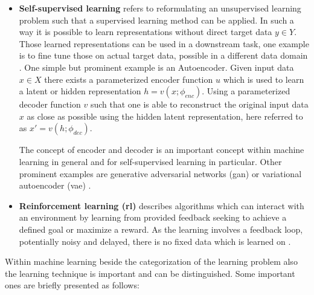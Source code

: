 \documentclass[../main.tex]{subfiles}
\begin{document}
\begin{itemize}
    \item \textbf{Self-supervised learning} refers to reformulating an unsupervised learning problem such that a supervised learning method can be applied. In such a way it is possible to learn representations without direct target data $y \in Y$. Those learned representations can be used in a downstream task, one example is to fine tune those on actual target data, possible in a different data domain \cite{kolesnikov_revisiting_2019}. One simple but prominent example is an Autoencoder. Given input data $x \in X$ there exists a parameterized encoder function $u$ which is used to learn a latent or hidden representation $h=v(x; \phi_{enc})$. Using a parameterized decoder function $v$ such that one is able to reconstruct the original input data $x$ as close as possible using the hidden latent representation, here referred to as $x'=v(h;\phi_{dec})$. 
    
    The concept of encoder and decoder is an important concept within machine learning in general and for self-supervised learning in particular. Other prominent examples are generative adversarial networks (\acs{gan}) \cite{goodfellow_generative_2014} or variational autoencoder (\acs{vae}) \cite{kingma_auto-encoding_2014}.

    \item \textbf{Reinforcement learning (\acs{rl})}  describes algorithms which can interact with an environment by learning from provided feedback seeking to achieve a defined goal or maximize a reward. As the learning involves a feedback loop, potentially noisy and delayed, there is no fixed data which is learned on \cite{sutton_reinforcement_nodate}.
\end{itemize}

Within machine learning beside the categorization of the learning problem also the learning technique is important and can be distinguished. Some important ones are briefly presented as follows:
\end{document}
